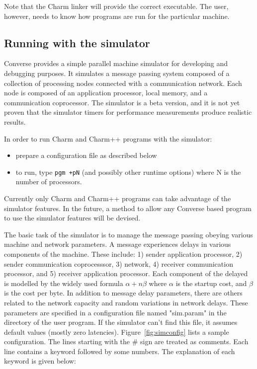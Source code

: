 Note that the Charm linker will provide the correct 
executable. The user, however, needs to know how programs are run for
the particular machine.

\subsection[Running with the simulator]{Running with the simulator}

Converse provides a simple parallel machine simulator for developing
and debugging purposes.  It simulates a message passing system
composed of a collection of processing nodes connected with a
communication network. Each node is composed of an application
processor, local memory, and a communication coprocessor.  The
simulator is a beta version, and it is not yet proven that the
simulator timers for performance measurements produce realistic
results.


In order to run Charm and Charm++ programs with the simulator:
\begin{itemize}

\item prepare a configuration file as described below

\item to run, type \verb#pgm +pN# (and possibly other runtime options) where
   N is the number of processors.

\end{itemize}
Currently only Charm and Charm++ programs can take advantage of the
simulator features.
In the future, a method to allow any Converse based program
to use the simulator features will be devised.

The basic task of the simulator is to manage the message passing
obeying various machine and network parameters.  A message experiences
delays in various components of the machine. These include: 1) sender
application processor, 2) sender communication coprocesssor, 3)
network, 4) receiver communication processor, and 5) receiver
application processor.  Each component of the delayed is modelled by
the widely used formula $\alpha + n\beta$ where $\alpha$ is the
startup cost, and $\beta$ is the cost per byte.  In addition to
message delay parameters, there are others related to the network
capacity and random variations in network delays. These parameters are
specified in a configuration file named "sim.param" in the directory
of the user program. If the simulator can't find this file, it assumes
default values (mostly zero latencies).  Figure~\ref{fig:simconfig}
lists a sample configuration. The lines starting with the \# sign are
treated as comments. Each line contains a keyword followed by some
numbers. The explanation of each keyword is given below:

